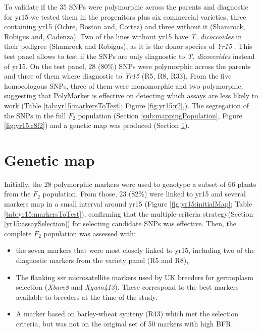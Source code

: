 To validate if the 35 SNPs were polymorphic across the parents and diagnostic for \acrshort{yr15} we tested them in the progenitors plus six commercial varieties, three containing \acrshort{yr15} (Ochre, Boston and, Cortez) and three without it (Shamrock, Robigus and, Cadenza).
Two of the lines without \acrshort{yr15} have \textit{T. dicoccoides} in their pedigree (Shamrock and Robigus), as it is the donor species of \textit{Yr15} \citep{mcintosh1995}. 
This test panel allows to test if the SNPs are only diagnostic to \textit{T. dicoccoides} instead of \acrshort{yr15}.
On the test panel, 28 ($80\%$) SNPs were polymorphic across the parents and three of them where diagnostic to \textit{Yr15} (R5, R8, R33).
From the five homoeologous SNPs, three of them were monomorphic and two polymorphic, suggesting that PolyMarker is effective on detecting which assays are less likely to work (Table \ref{tab:yr15:markersToTest}; Figure \ref{fig:yr15:r2},).
The segregation of the SNPs in the full $F_{2}$ population (Section \ref{sub:mappingPopulation}, Figure \ref{fig:yr15:r8f2}) and a genetic map was produced (Section \ref{yr15:geneticMap}).   






\section{Genetic map} 
\label{yr15:geneticMap}


Initially, the 28 polymorphic markers were used to genotype a subset of 66 plants from the $F_{2}$ population. 
From those, 23 (82\%) were linked to \acrshort{yr15} and several markers map in a small interval around \acrshort{yr15} (Figure \ref{fig:yr15:initialMap}; Table \ref{tab:yr15:markersToTest}), confirming that the multiple-criteria strategy(Section \ref{yr15:assaySelection}) for selecting candidate SNPs was effective. 
Then, the complete $F_{2}$ population was assessed with:
\begin{itemize}	
	\item  the seven markers that were most closely linked to \acrshort{yr15}, including two of the diagnostic markers from the variety panel (R5 and R8),
	\item The flanking \acrshort{ssr} microsatellite markers used by UK breeders for germoplasm selection (\textit{Xbarc8} and \textit{Xgwm413}).  These correspond to the best markers available to breeders at the time of the study.
	\item A marker based on barley-wheat synteny (R43) which met the selection criteria, but was not on the original set of 50 markers with high BFR. 
\end{itemize}

